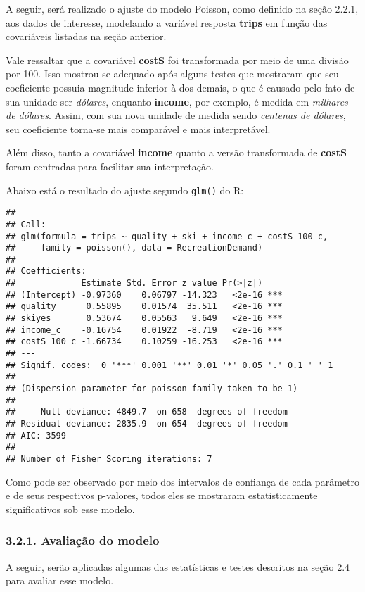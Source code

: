 \documentclass[
]{article}
\begin{document}
A seguir, será realizado o ajuste do modelo Poisson, como definido na
seção 2.2.1, aos dados de interesse, modelando a variável resposta
\textbf{trips} em função das covariáveis listadas na seção anterior.

Vale ressaltar que a covariável \textbf{costS} foi transformada por meio
de uma divisão por 100. Isso mostrou-se adequado após alguns testes que
mostraram que seu coeficiente possuia magnitude inferior à dos demais, o
que é causado pelo fato de sua unidade ser \emph{dólares}, enquanto
\textbf{income}, por exemplo, é medida em \emph{milhares de dólares}.
Assim, com sua nova unidade de medida sendo \emph{centenas de dólares},
seu coeficiente torna-se mais comparável e mais interpretável.

Além disso, tanto a covariável \textbf{income} quanto a versão
transformada de \textbf{costS} foram centradas para facilitar sua
interpretação.

Abaixo está o resultado do ajuste segundo \texttt{glm()} do R:

\begin{verbatim}
## 
## Call:
## glm(formula = trips ~ quality + ski + income_c + costS_100_c, 
##     family = poisson(), data = RecreationDemand)
## 
## Coefficients:
##             Estimate Std. Error z value Pr(>|z|)    
## (Intercept) -0.97360    0.06797 -14.323   <2e-16 ***
## quality      0.55895    0.01574  35.511   <2e-16 ***
## skiyes       0.53674    0.05563   9.649   <2e-16 ***
## income_c    -0.16754    0.01922  -8.719   <2e-16 ***
## costS_100_c -1.66734    0.10259 -16.253   <2e-16 ***
## ---
## Signif. codes:  0 '***' 0.001 '**' 0.01 '*' 0.05 '.' 0.1 ' ' 1
## 
## (Dispersion parameter for poisson family taken to be 1)
## 
##     Null deviance: 4849.7  on 658  degrees of freedom
## Residual deviance: 2835.9  on 654  degrees of freedom
## AIC: 3599
## 
## Number of Fisher Scoring iterations: 7
\end{verbatim}

Como pode ser observado por meio dos intervalos de confiança de cada
parâmetro e de seus respectivos p-valores, todos eles se mostraram
estatisticamente significativos sob esse modelo.

\subsubsection{3.2.1. Avaliação do
modelo}\label{avaliauxe7uxe3o-do-modelo}

A seguir, serão aplicadas algumas das estatísticas e testes descritos na
seção 2.4 para avaliar esse modelo.
\end{document}

